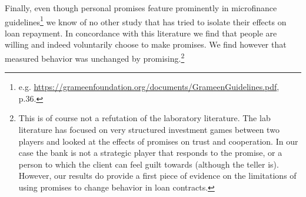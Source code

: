 \documentclass[oneside,11pt]{article}
\begin{document}


Finally, even though personal promises feature prominently in microfinance guidelines\footnote{e.g. \url{https://grameenfoundation.org/documents/GrameenGuidelines.pdf}, p.36.} we know of no other study that has tried to isolate their effects on loan repayment.  In concordance with this literature we find that people are willing and indeed voluntarily choose to make promises. We find however that measured behavior was unchanged by promising.\footnote{This is of course not a refutation of the laboratory literature. %
The lab literature has focused on very structured investment games between two players and looked at the effects of promises on trust and cooperation. In our case the bank is not a strategic player that responds to the promise, or a person to which the client can feel guilt towards (although the teller is). However, our results do provide a first piece of evidence on the limitations of using promises to change behavior in loan contracts.}



\end{document}
